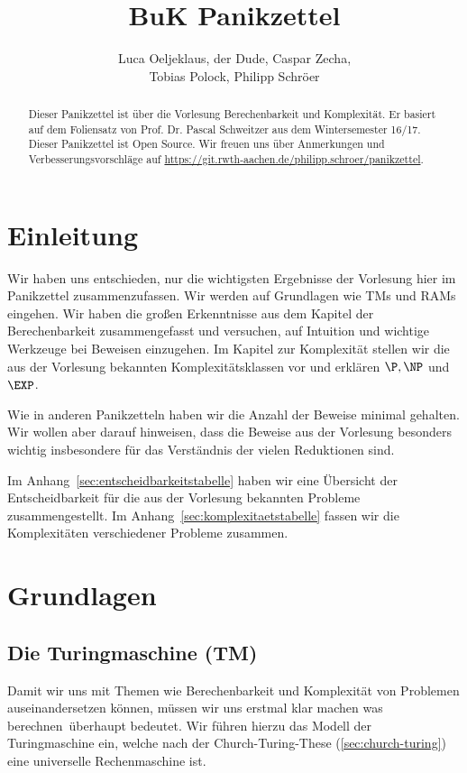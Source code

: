 \documentclass[a4paper,parskip=half*,DIV=7,fontsize=11pt]{scrartcl}
\title{BuK Panikzettel}
\author{Luca Oeljeklaus, der Dude\blfootnote{Pseudonyme geh\"oren anonymen Autoren, die anonym bleiben wollen.}, Caspar Zecha,\\ Tobias Polock, Philipp Schröer}
\begin{document}
\maketitle

\begin{abstract}
Dieser Panikzettel ist über die Vorlesung Berechenbarkeit und Komplexität. Er basiert auf dem Foliensatz von Prof. Dr. Pascal Schweitzer aus dem Wintersemester 16/17.	\\
Dieser Panikzettel ist Open Source. Wir freuen uns über Anmerkungen und Verbesserungsvorschläge auf \url{https://git.rwth-aachen.de/philipp.schroer/panikzettel}.
\end{abstract}

\tableofcontents

\newpage

\section{Einleitung}

Wir haben uns entschieden, nur die wichtigsten Ergebnisse der Vorlesung hier im Panikzettel zusammenzufassen. Wir werden auf Grundlagen wie TMs und RAMs eingehen. Wir haben die großen Erkenntnisse aus dem Kapitel der Berechenbarkeit zusammengefasst und versuchen, auf Intuition und wichtige Werkzeuge bei Beweisen einzugehen. Im Kapitel zur Komplexität stellen wir die aus der Vorlesung bekannten Komplexitätsklassen vor und erklären $\P, \NP$ und $\EXP$. 

Wie in anderen Panikzetteln haben wir die Anzahl der Beweise minimal gehalten. Wir wollen aber darauf hinweisen, dass die Beweise aus der Vorlesung besonders wichtig insbesondere für das Verständnis der vielen Reduktionen sind.

Im Anhang~\ref{sec:entscheidbarkeitstabelle} haben wir eine Übersicht der Entscheidbarkeit für die aus der Vorlesung bekannten Probleme zusammengestellt. Im Anhang~\ref{sec:komplexitaetstabelle} fassen wir die Komplexitäten verschiedener Probleme zusammen.

\section{Grundlagen}
\subsection{Die Turingmaschine (TM)}
Damit wir uns mit Themen wie Berechenbarkeit und Komplexität von Problemen auseinandersetzen können, müssen wir uns erstmal klar machen was  \glqq berechnen\grqq\ überhaupt bedeutet. Wir führen hierzu das Modell der Turingmaschine ein, welche nach der Church-Turing-These (\ref{sec:church-turing}) eine universelle Rechenmaschine ist.
\end{document}
